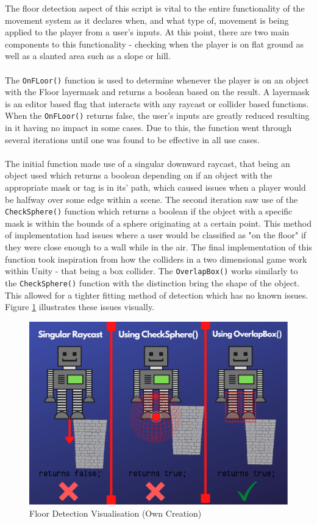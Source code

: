 \noindent The floor detection aspect of this script is vital to the entire functionality of the movement system as it declares when, and what type of, movement is being applied to the player from a user's inputs. At this point, there are two main components to this functionality - checking when the player is on flat ground as well as a slanted area such as a slope or hill. 
\\\\
The \texttt{OnFLoor()} function is used to determine whenever the player is on an object with the Floor layermask and returns a boolean based on the result. A layermask is an editor based flag that interacts with any raycast or collider based functions. When the \texttt{OnFLoor()} returns false, the user's inputs are greatly reduced resulting in it having no impact in some cases. Due to this, the function went through several iterations until one was found to be effective in all use cases. 
\\\\
The initial function made use of a singular downward raycast, that being an object used which returns a boolean depending on if an object with the appropriate mask or tag is in its' path, which caused issues when a player would be halfway over some edge within a scene. The second iteration saw use of the \texttt{CheckSphere()} function which returns a boolean if the object with a specific mask is within the bounds of a sphere originating at a certain point. This method of implementation had issues where a user would be classified as "on the floor" if they were close enough to a wall while in the air. The final implementation of this function took inspiration from how the colliders in a two dimensional game work within Unity - that being a box collider. The \texttt{OverlapBox()} works similarly to the \texttt{CheckSphere()} function with the distinction bring the shape of the object. This allowed for a tighter fitting method of detection which has no known issues. Figure \ref{floor} illustrates these issues visually. 

\begin{figure}[H]
\centering
\includegraphics[scale=0.61]{Figures/floor.png}
\caption{Floor Detection Visualisation (Own Creation)}
\label{floor}
\end{figure}


